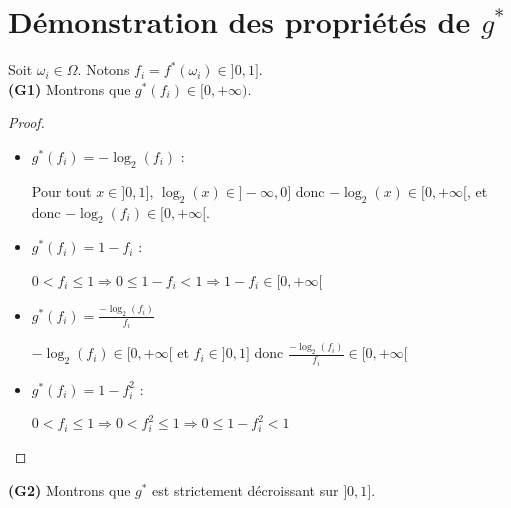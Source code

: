 \documentclass[a4paper]{article}
\begin{document}
\label{appendix:demo-f}

\section{Démonstration des propriétés de $g^*$}

Soit $\omega_i \in \Omega$. Notons $f_i = f^*(\omega_i) \in ]0,1]$. \\

\textbf{(G1)} Montrons que $g^*(f_i) \in [0, +\infty)$.

\begin{proof}
\begin{itemize}
    \item $g^*(f_i) = -\log_{2}(f_i)$ :

        Pour tout $x \in ]0,1]$, $\log_{2}(x) \in ]-\infty, 0]$ donc $-\log_{2}(x)
        \in [0,+\infty[$, et donc $-\log_{2}(f_i) \in [0,+\infty[$.

    \item $g^*(f_i) = 1 - f_i$ : 

        $0 < f_i \leq 1 \Rightarrow 0 \leq 1-f_i < 1 \Rightarrow 1-f_i \in
        [0,+\infty[$

    \item $g^*(f_i) = \frac{-\log_{2}(f_i)}{f_i}$

        $-\log_{2}(f_i) \in [0,+\infty[$ et $f_i \in ]0,1]$ donc
        $\frac{-\log_{2}(f_i)}{f_i} \in [0,+\infty[$

    \item $g^*(f_i) = 1-f_i^2$ :

        $0 < f_i \leq 1 \Rightarrow 0 < f_i^2 \leq 1 \Rightarrow 0 \leq 1-f_i^2
        < 1$

\end{itemize}
\end{proof}

\textbf{(G2)} Montrons que $g^*$ est strictement décroissant sur $]0,1]$.
\end{document}
